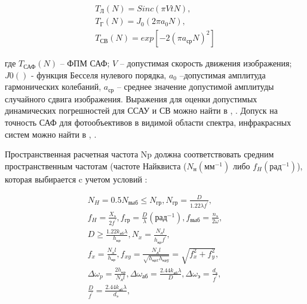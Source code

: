 \begin{equation}
\label{eq:p2:7}
\begin{alignedat}{3}
T_\textit{Л}\left(N\right)=Sinc(\pi{}VtN) , \\
T_{\textit{Г}}(N)=J_0\left(2\pi{}a_0N\right) , \\
T_{\textit{СВ}}\left(N\right) = exp[-2{(\pi{}a_{\textit{ср}}N)}^2]
\end{alignedat}
\end{equation}

где $T_{\textit{САФ}}(N)$ – ФПМ САФ; 
$V$ – допустимая скорость движения изображения; 
$J0()$ - функция Бесселя нулевого порядка, 
$a_0$ –допустимая амплитуда гармонических колебаний,   
$a_{\textit{ср}}$ – среднее значение допустимой амплитуды случайного сдвига изображения. 
Выражения для оценки допустимых динамических погрешностей для ССАУ и СВ можно найти в \cite[]{Karpov}, \cite[]{Karpov23}. Допуск на точность САФ для фотообъективов в видимой области спектра, инфракрасных систем можно найти в \cite[]{Tarasov}, \cite[]{Belyakov}.

Пространственная расчетная частота Np должна соответствовать средним пространственным частотам (частоте Найквиста ($N_{\textit{н}} (\textit{мм}^{-1})$ либо $f_H (\textit{рад}^{-1})$), которая выбирается c учетом условий \cite[]{Tarasov}: 

\begin{equation}
\label{eq:p2:8}
\begin{alignedat}{2}
N_H=0.5 N_{\textit{выб}}\leq{}N_{\textit{гр}},
N_{\textit{гр}}=\frac{D}{1.22\lambda{}f^{'}},\\
f_H=\frac{X_\textit{э}}{2f^{'}},
f_{\textit{гр}}=\frac{D}{\lambda{}}(\textit{рад}^{-1}),
f_{\textit{выб}}=\frac{n_{\textit{э}}}{2\omega{}},\\
D\geq{}\frac{1.22 k_{\textit{аб}}\lambda{}}{h_{\textit{кр}}},
N_x=\frac{N_{\textit{д}}l}{h_{\textit{кр}}f^{'}},\\
f_x=\frac{N_{\textit{д}}l}{h_{\textit{кр}}},
f_{xy}=\frac{N_{\textit{д}}l}{\sqrt{h_{\textit{крx}}h_{\textit{крy}}}}=\sqrt{f_x^2+f_y^2},\\
\Delta{}{\omega{}}_p=\frac{2h_{\textit{кр}}}{N_{\textit{д}}l},
\Delta{}{\omega{}}_{\textit{аб}} =\frac{2.44 k_{\textit{аб}}\lambda{}}{D},
\Delta{}{\omega{}}_{\textit{э}} =\frac{d_{\textit{э}}}{f^{'}},\\
\frac{D}{f^{'}}=\frac{2.44 k_{\textit{аб}}\lambda{}}{d_{\textit{э}}},\\
\end{alignedat}
\end{equation}

